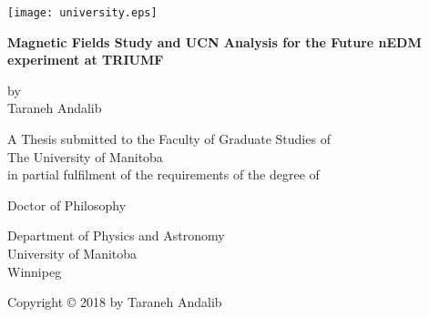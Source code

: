 \documentclass[12pt,a4paper]{book}
\begin{document}

\noindent
\begin{titlepage}
  \begin{center}
         \texttt{[image: university.eps]}\\
        \vspace*{1cm}
        
        \textbf{Magnetic Fields Study and UCN Analysis for the Future
          nEDM experiment at TRIUMF}
        
        \vspace{0.5cm}
        
        \vspace{1.5cm}
        
        by\\
        \vspace{1.0cm}
        Taraneh Andalib

        \vspace{2.5cm}
        A Thesis submitted to the Faculty of Graduate Studies of\\
        \vspace{0.5cm}
        The University of Manitoba\\
        \vspace{0.5cm}
        in partial fulfilment of the requirements of the degree of
        
        \vspace{2.0cm}
        
       
        Doctor of Philosophy\\
       \vspace{0.5cm}
        
   
        \vspace{0.5cm}
        Department of Physics and Astronomy\\
        University of Manitoba\\
        Winnipeg

        \vspace{3.0cm}
        Copyright © 2018 by Taraneh Andalib
        
    \end{center}
\end{titlepage}
\end{document}
